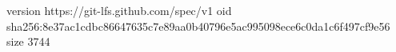 version https://git-lfs.github.com/spec/v1
oid sha256:8e37ac1cdbc86647635c7e89aa0b40796e5ac995098ece6c0da1c6f497cf9e56
size 3744
